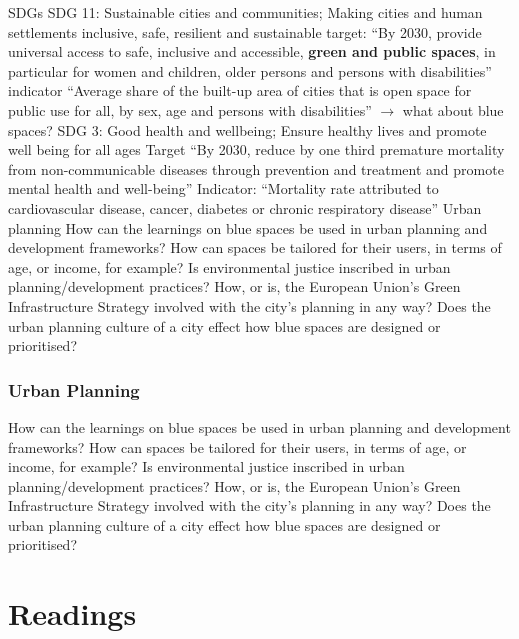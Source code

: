 \documentclass{article}
\begin{document}
\begin{outline}
	\1 SDGs
		\2 SDG 11: Sustainable cities and communities; Making cities and human settlements inclusive, safe, resilient and sustainable
			 target: ``By 2030, provide universal access to safe, inclusive and accessible, \textbf{green and public spaces}, in particular for women and children, older persons and persons with disabilities''
			 indicator ``Average share of the built-up area of cities that is open space for public use for all, by sex, age and persons with disabilities'' $\rightarrow$ what about blue spaces?
		\2 SDG 3: Good health and wellbeing; Ensure healthy lives and promote well being for all ages
			 Target ``By 2030, reduce by one third premature mortality from non-communicable diseases through prevention and treatment and promote mental health and well-being''
			 Indicator: ``Mortality rate attributed to cardiovascular disease, cancer, diabetes or chronic respiratory disease''
	\1 Urban planning
		\2 How can the learnings on blue spaces be used in urban planning and development frameworks? How can spaces be tailored for their users, in terms of age, or income, for example?
		\2 Is environmental justice inscribed in urban planning/development practices?
		\2 How, or is, the European Union's Green Infrastructure Strategy involved with the city's planning in any way?
		\2 Does the urban planning culture of a city effect how blue spaces are designed or prioritised?
\end{outline}

\subsubsection{Urban Planning}

\begin{outline}
	\1 How can the learnings on blue spaces be used in urban planning and development frameworks? How can spaces be tailored for their users, in terms of age, or income, for example?
	\1 Is environmental justice inscribed in urban planning/development practices?
	\1 How, or is, the European Union's Green Infrastructure Strategy involved with the city's planning in any way?
	\1 Does the urban planning culture of a city effect how blue spaces are designed or prioritised?
\end{outline}


\section{Readings}
\end{document}

